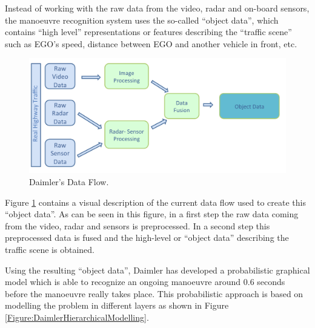 Instead of working with the raw data from the video, radar and on-board sensors, the manoeuvre recognition system uses the so-called ``object data'', which contains ``high level'' representations or features describing the ``traffic scene'' such as EGO's speed, distance between EGO and another vehicle in front, etc.  
\begin{figure}
\begin{center}
\includegraphics[scale=0.35]{./figures/DaimlerDataFlow}
\caption{\label{Figure:DaimlerDataFlow} Daimler's Data Flow.}
\end{center}
\end{figure}

Figure \ref{Figure:DaimlerDataFlow} contains a visual description of the current data flow used to create this ``object data''.  As can be seen in this figure, in a first step the raw data coming from the video, radar and sensors is preprocessed. In a second step this preprocessed data is fused and the high-level or ``object data'' describing the traffic scene is obtained. 

Using the resulting ``object data'', Daimler has developed a probabilistic graphical model \cite{kasper2012object} which is able to recognize an ongoing manoeuvre around 0.6 seconds before the manoeuvre really takes place. This probabilistic approach is based on modelling the problem in different layers as shown in Figure \ref{Figure:DaimlerHierarchicalModelling}.



